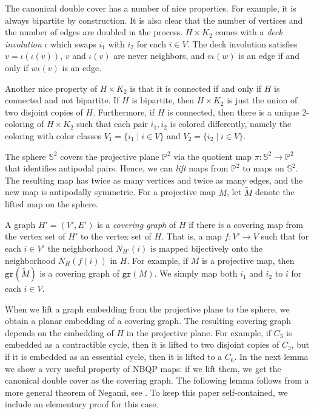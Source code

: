 \documentclass{article}
\newcommand{\Pb}[0]{\mathbb{P}}
\newcommand{\Sb}[0]{\mathbb{S}}
\newcommand{\gr}{\mathtt{gr}}
\begin{document}
The canonical double cover has a number of nice properties. For example, it is always bipartite by construction. It is also clear that the number of vertices and the number of edges are doubled in the process.  $H\times K_2$ comes with a \emph{deck involution} $\iota$ which swaps $i_1$ with $i_2$ for each $i\in V$. The deck involution satisfies $v=\iota(\iota(v))$, $v$ and $\iota(v)$ are never neighbors, and $v\iota(w)$ is an edge if and only if $w\iota(v)$ is an edge.





Another nice property of $ H\times K_2$ is that it is connected if and only if $H$ is connected and not bipartite. If $H$ is bipartite, then  $H\times K_2$ is just the union of two disjoint copies of $H$. Furthermore, if $H$ is connected, then there is a unique 2-coloring of $H\times K_2$ such that each pair $i_1,i_2$ is colored differently, namely the coloring with color classes $V_1=\{i_1\mid i\in V\}$ and $V_2=\{i_2\mid i\in V\}$.  


The sphere $\Sb^2$ covers the projective plane $\Pb^2$ via the quotient map $\pi:\Sb^2\to\Pb^2$ that identifies antipodal pairs. Hence, we can \emph{lift} maps from $\Pb^2$ to maps on $\Sb^2$. The resulting map has twice as many vertices and twice as many edges, and the new map is antipodally symmetric. For a projective map $M$, let $\widetilde M$ denote the lifted map on the sphere.

A graph $H'=(V',E')$ is a \emph{covering graph} of $H$ if there is a covering map from the vertex set of $H'$ to the vertex set of $H$. That is, a map $f:V'\rightarrow V$ such that for each $i\in V'$ the neighborhood $N_{H'}(i)$ is mapped bijectively onto the neighborhood $N_{H}(f(i))$ in $H$. For example, if $M$ is a projective map, then $\gr(\widetilde M)$ is a covering graph of $\gr(M)$. We simply map both $i_1$ and $i_2$ to $i$ for each $i\in V$.

When we lift a graph embedding from the projective plane to the sphere, we obtain a planar embedding of a covering graph. The resulting covering graph depends on the embedding of $H$ in the projective plane. For example, if $C_3$ is embedded as a contractible cycle, then it is lifted to two disjoint copies of $C_3$, but if it is embedded as an essential cycle, then it is lifted to a $C_6$. In the next lemma we show a very useful property of NBQP maps: if we lift them, we get the canonical double cover as the covering graph. The following lemma follows from a more general theorem of Negami, see \cite{NE92}. To keep this paper self-contained, we include an elementary proof for this case. 
\end{document}
